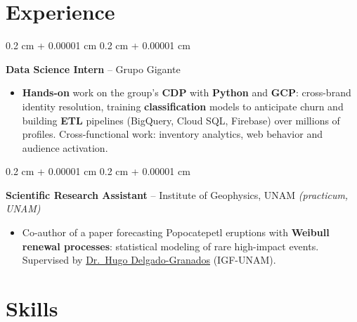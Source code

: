 \documentclass[10pt, letterpaper]{article}
\newenvironment{highlights}{
    \begin{itemize}[
        topsep=0.02 cm,
        parsep=0.05 cm,
        partopsep=0pt,
        itemsep=0pt,
        leftmargin=0.4 cm + 10pt
    ]
}{
    \end{itemize}
}
\newenvironment{onecolentry}{
    \begin{adjustwidth}{
        0.2 cm + 0.00001 cm
    }{
        0.2 cm + 0.00001 cm
    }
}{
    \end{adjustwidth}
}
\let\hrefWithoutArrow\href
\renewcommand{\href}[2]{\hrefWithoutArrow{#1}{\ifthenelse{\equal{#2}{}}{ }{#2 }\raisebox{.15ex}{\footnotesize \faExternalLink*}}}
\begin{document}
    \section{Experience}

        \begin{onecolentry}
            \textbf{Data Science Intern} -- Grupo Gigante
            \begin{highlights}
                \item \textbf{Hands-on} work on the group's \textbf{CDP} with \textbf{Python} and \textbf{GCP}: cross-brand identity resolution, training \textbf{classification} models to anticipate churn and building \textbf{ETL} pipelines (BigQuery, Cloud SQL, Firebase) over millions of profiles. Cross-functional work: inventory analytics, web behavior and audience activation.
            \end{highlights}
            \end{onecolentry}

        \vspace{0.02 cm}

        \begin{onecolentry}
            \textbf{Scientific Research Assistant} -- Institute of Geophysics, UNAM \textit{(practicum, UNAM)}
            \begin{highlights}
                \item Co-author of a paper forecasting Popocatepetl eruptions with \textbf{Weibull renewal processes}: statistical modeling of rare high-impact events. Supervised by \hrefWithoutArrow{https://scholar.google.com/citations?user=lDD0DZQAAAAJ}{Dr.\ Hugo Delgado-Granados} (IGF-UNAM).
            \end{highlights}
            \end{onecolentry}


    \section{Skills}
\end{document}
